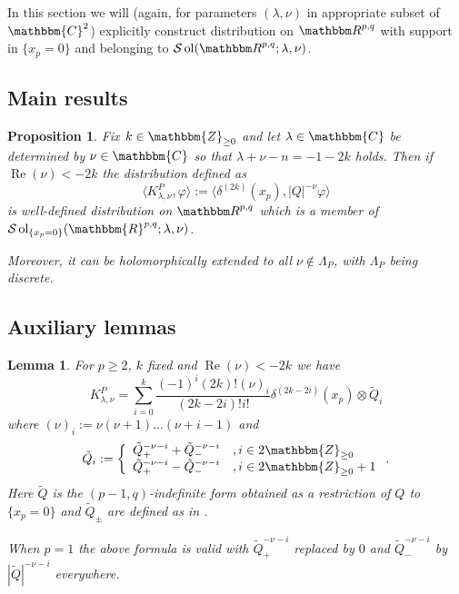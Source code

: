 \documentclass{article}
\newcommand{\assign}{:=}
\newcommand{\nin}{\not\in}
\newcommand{\tmop}[1]{\ensuremath{\operatorname{#1}}}
\numberwithin{definition}{section}
\newtheorem{lemma}{Lemma}
\numberwithin{lemma}{section}
\newtheorem{proposition}{Proposition}
\numberwithin{proposition}{section}
{\theorembodyfont{\rmfamily}\newtheorem{remark}{Remark}
\numberwithin{remark}{section}
}
\newcommand{\C}{{\mathbbm{C}}}\newcommand{\Z}{{\mathbbm{Z}}}
\begin{document}
In this section we will (again, for parameters $(\lambda, \nu)$ in appropriate
subset of $\C^2$) explicitly construct distribution on $\R^{p, q}$ with
support in $\{ x_p = 0 \}$ and belonging to $\mathcal{S} \tmop{ol} ( \R^{p, q}
; \lambda, \nu)$.

\subsection{Main results}

\begin{proposition}
  \label{prop:supp-p}Fix $k \in \Z_{\ge 0}$ and let $\lambda \in \C$ be
  determined by $\nu \in \C$ so that $\lambda + \nu - n = - 1 - 2 k$ holds.
  Then if $\tmop{Re} (\nu) < - 2 k$ the distribution defined as
  \[ \langle K_{\lambda, \nu}^P, \varphi \rangle \assign \langle \delta^{(2
     k)} (x_p), | Q |^{- \nu} \varphi \rangle \]
  is well-defined distribution on $\R^{p, q}$ which is a member of
  $\mathcal{S} \tmop{ol}_{\{ x_p = 0 \}} ( \mathbbm{R}^{p, q} ; \lambda,
  \nu)$.
  
  Moreover, it can be holomorphically extended to all $\nu \nin \Lambda_P$,
  with $\Lambda_P$ being discrete.
\end{proposition}

\subsection{Auxiliary lemmas}

\begin{lemma}
  \label{lem:supp-p}For $p \geqslant 2$, $k$ fixed and $\tmop{Re} (\nu) < - 2
  k$ we have
  \begin{equation}
    \label{eq:supp-p-mero} K^P_{\lambda, \nu} = \sum_{i = 0}^k \frac{(- 1)^i
    (2 k) ! (\nu)^{}_i}{(2 k - 2 i) !i!} \delta^{(2 k - 2 i)} (x_p) \otimes
    \tilde{Q}_i
  \end{equation}
  where $(\nu)^{}_i \assign \nu (\nu + 1) \ldots (\nu + i - 1)$ and
  \[ \tilde{Q}_i \assign \left\{ \begin{array}{ll}
       \tilde{Q}_+^{- \nu - i} + \tilde{Q}_-^{- \nu - i} & , i \in 2 \Z_{\ge
       0}\\
       \tilde{Q}_+^{- \nu - i} - \tilde{Q}_-^{- \nu - i} & , i \in 2 \Z_{\ge
       0} + 1
     \end{array} \right. . \]
  Here $\tilde{Q}$ is the $(p - 1, q)$-indefinite form obtained as a
  restriction of $Q$ to $\{ x_p = 0 \}$ and $\tilde{Q}_{\pm}$ are defined as
  in {\cite[sec. III.2.2]{gelfand1980distribution}}.
  
  When $p = 1$ the above formula is valid with $\tilde{Q}_+^{- \nu - i}$
  replaced by $0$ and $\tilde{Q}_-^{- \nu - i}$ by $| \tilde{Q} |^{- \nu - i}$
  everywhere.
\end{lemma}
\end{document}
